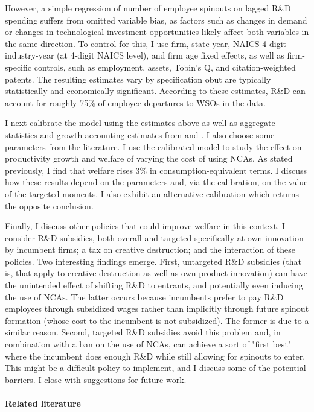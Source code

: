 \documentclass[11pt,english]{article}
\begin{document}
However, a simple regression of number of employee spinouts on lagged R\&D spending suffers from omitted variable bias, as factors such as changes in demand or changes in technological investment opportunities likely affect both variables in the same direction. To control for this, I use firm, state-year, NAICS 4 digit industry-year (at 4-digit NAICS level), and firm age fixed effects, as well as firm-specific controls, such as employment, assets, Tobin's Q, and citation-weighted patents. The resulting estimates vary by specification obut are typically statistically and economically significant. According to these estimates, R\&D can account for roughly 75\% of employee departures to WSOs in the data. 

I next calibrate the model using the estimates above as well as aggregate statistics and growth accounting estimates from \cite{garcia-macia_how_2019} and \cite{klenow_innovative_2020}. I also choose some parameters from the literature. I use the calibrated model to study the effect on productivity growth and welfare of varying the cost of using NCAs. As stated previously, I find that welfare rises 3\% in consumption-equivalent terms. I discuss how these results depend on the parameters and, via the calibration, on the value of the targeted moments. I also exhibit an alternative calibration which returns the opposite conclusion. 

Finally, I discuss other policies that could improve welfare in this context. I consider R\&D subsidies, both overall and targeted specifically at own innovation by incumbent firms; a tax on creative destruction; and the interaction of these policies. Two interesting findings emerge. First, untargeted R\&D subsidies (that is, that apply to creative destruction as well as own-product innovation) can have the unintended effect of shifting R\&D to entrants, and potentially even inducing the use of NCAs. The latter occurs because incumbents prefer to pay R\&D employees through subsidized wages rather than implicitly through future spinout formation (whose cost to the incumbent is not subsidized). The former is due to a similar reason. Second, targeted R\&D subsidies avoid this problem and, in combination with a ban on the use of NCAs, can achieve a sort of "first best" where the incumbent does enough R\&D while still allowing for spinouts to enter. This might be a difficult policy to implement, and I discuss some of the potential barriers. I close with suggestions for future work. 

\paragraph{Related literature}
\end{document}

